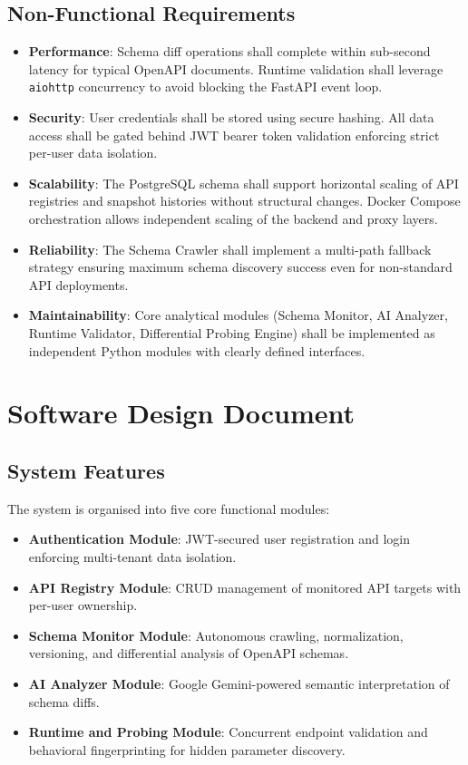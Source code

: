 \documentclass{fisatprojectfinal}
\begin{document}
\subsection{Non-Functional Requirements}
\begin{itemize}
    \item \textbf{Performance}: Schema diff operations shall complete within sub-second latency for typical OpenAPI documents. Runtime validation shall leverage \texttt{aiohttp} concurrency to avoid blocking the FastAPI event loop.
    \item \textbf{Security}: User credentials shall be stored using secure hashing. All data access shall be gated behind JWT bearer token validation enforcing strict per-user data isolation.
    \item \textbf{Scalability}: The PostgreSQL schema shall support horizontal scaling of API registries and snapshot histories without structural changes. Docker Compose orchestration allows independent scaling of the backend and proxy layers.
    \item \textbf{Reliability}: The Schema Crawler shall implement a multi-path fallback strategy ensuring maximum schema discovery success even for non-standard API deployments.
    \item \textbf{Maintainability}: Core analytical modules (Schema Monitor, AI Analyzer, Runtime Validator, Differential Probing Engine) shall be implemented as independent Python modules with clearly defined interfaces.
\end{itemize}

\section{Software Design Document}
\subsection{System Features}
The system is organised into five core functional modules:
\begin{itemize}
    \item \textbf{Authentication Module}: JWT-secured user registration and login enforcing multi-tenant data isolation.
    \item \textbf{API Registry Module}: CRUD management of monitored API targets with per-user ownership.
    \item \textbf{Schema Monitor Module}: Autonomous crawling, normalization, versioning, and differential analysis of OpenAPI schemas.
    \item \textbf{AI Analyzer Module}: Google Gemini-powered semantic interpretation of schema diffs.
    \item \textbf{Runtime and Probing Module}: Concurrent endpoint validation and behavioral fingerprinting for hidden parameter discovery.
\end{itemize}
\end{document}
